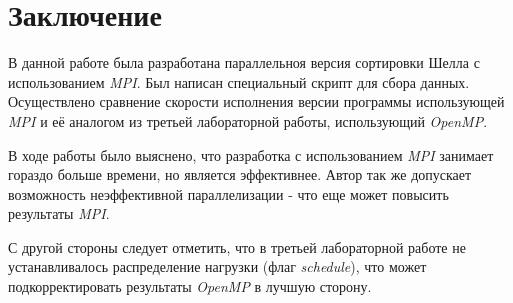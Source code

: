 \documentclass[a4paper, 12pt]{article}
\begin{document}

\section{Заключение}
В данной работе была разработана параллельноя версия сортировки Шелла с использованием \textit{MPI}. Был написан специальный скрипт для сбора данных. Осуществлено сравнение скорости исполнения версии программы использующей \textit{MPI} и её аналогом из третьей лабораторной работы, использующий \textit{OpenMP}.

В ходе работы было выяснено, что разработка с использованием \textit{MPI} занимает гораздо больше времени, но является эффективнее. Автор так же допускает возможность неэффективной параллелизации - что еще может повысить результаты \textit{MPI}.

С другой стороны следует отметить, что в третьей лабораторной работе не устанавливалось распределение нагрузки (флаг \textit{schedule}), что может подкорректировать результаты \textit{OpenMP} в лучшую сторону.
\end{document}
